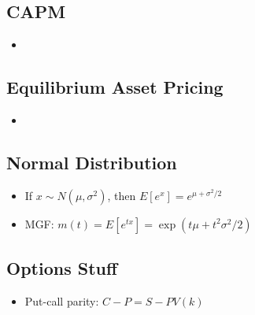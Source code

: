 \documentclass{article}
\begin{document}
\subsection*{CAPM}

\begin{itemize}

\item 

\end{itemize}

\subsection*{Equilibrium Asset Pricing}

\begin{itemize}

\item 

\end{itemize}

\subsection*{Normal Distribution}

\begin{itemize}

\item If $x \sim N(\mu, \sigma^2)$, then $E[e^x] = e^{\mu + \sigma^2/2}$

\item MGF: $m(t) = E[e^{tx}] = \exp(t \mu + t^2 \sigma^2/2)$

\end{itemize}

\subsection*{Options Stuff}

\begin{itemize}

\item Put-call parity: $C - P = S - PV(k)$

\end{itemize}
\end{document}

